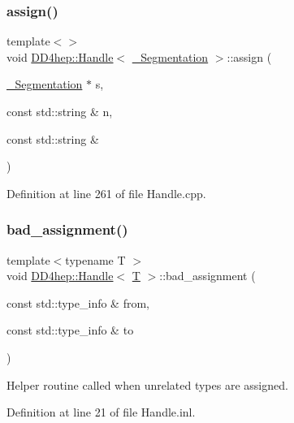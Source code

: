 \subsubsection{\texorpdfstring{assign()}{assign()}\hspace{0.1cm}{\footnotesize\ttfamily [2/2]}}
{\footnotesize\ttfamily template$<$$>$ \\
void \hyperlink{class_d_d4hep_1_1_handle}{D\+D4hep\+::\+Handle}$<$ \hyperlink{_handle_8cpp_a2cf2a89ef24384817ed33748f1243510}{\+\_\+\+Segmentation} $>$\+::assign (\begin{DoxyParamCaption}\item[{\hyperlink{_handle_8cpp_a2cf2a89ef24384817ed33748f1243510}{\+\_\+\+Segmentation} $\ast$}]{s,  }\item[{const std\+::string \&}]{n,  }\item[{const std\+::string \&}]{ }\end{DoxyParamCaption})}



Definition at line 261 of file Handle.\+cpp.

\hypertarget{class_d_d4hep_1_1_handle_a7d6ad39bc68063a34d8d42ce1d9aef75}{}\label{class_d_d4hep_1_1_handle_a7d6ad39bc68063a34d8d42ce1d9aef75} 
\subsubsection{\texorpdfstring{bad\+\_\+assignment()}{bad\_assignment()}}
{\footnotesize\ttfamily template$<$typename T $>$ \\
void \hyperlink{class_d_d4hep_1_1_handle}{D\+D4hep\+::\+Handle}$<$ \hyperlink{class_t}{T} $>$\+::bad\+\_\+assignment (\begin{DoxyParamCaption}\item[{const std\+::type\+\_\+info \&}]{from,  }\item[{const std\+::type\+\_\+info \&}]{to }\end{DoxyParamCaption})\hspace{0.3cm}{\ttfamily [static]}}



Helper routine called when unrelated types are assigned. 



Definition at line 21 of file Handle.\+inl.



